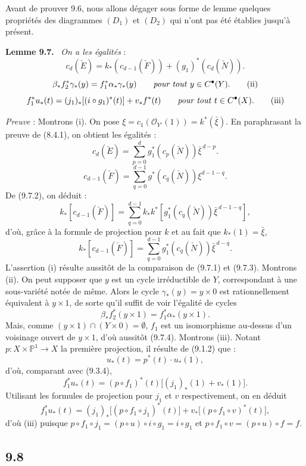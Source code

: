 \documentclass[11pt]{article}
\newenvironment{statement}[1]{\par\medskip\noindent\textbf{#1.}\ }{\par\medskip}
\begin{document}
Avant de prouver 9.6, nous allons dégager sous forme de lemme quelques propriétés des diagrammes $(D_1)$ et $(D_2)$ qui n'ont pas été établies jusqu'à présent.

\begin{statement}{Lemme 9.7}
\emph{On a les égalités} :
\[
c_d(\check E)=k_*(c_{d-1}(\check F))+(g_1)^*(c_d(\check N)).
\tag{i}
\]
\[
\beta_*f_2^*\gamma_*(y)=f_1^*\alpha_*\gamma_*(y)\qquad\text{\emph{pour tout} }y\in C^{\bullet}(Y).
\tag{ii}
\]
\[
f_1^*u_*(t)=(j_1)_*[(i\circ g_1)^*(t)]+v_*f^*(t)\qquad\text{\emph{pour tout} }t\in C^{\bullet}(X).
\tag{iii}
\]
\end{statement}

\emph{Preuve} : Montrons (i). On pose $\xi=c_1(\mathcal O_{Y'}(1))=k^*(\bar\xi)$. En paraphrasant la preuve de (8.4.1), on
obtient les égalités :
\[
c_d(\check E)=\sum_{p=0}^d g_1^*(c_p(\check N))\bar\xi^{\,d-p}.
\tag{9.7.1}
\]
\[
c_{d-1}(\check F)=\sum_{q=0}^{d-1}g^*(c_q(\check N))\xi^{d-1-q}.
\tag{9.7.2}
\]
De (9.7.2), on déduit :
\[
k_*[c_{d-1}(\check F)]
=\sum_{q=0}^{d-1}k_*k^*[g_1^*(c_q(\check N))\bar\xi^{\,d-1-q}],
\]
d'où, grâce à la formule de projection pour $k$ et au fait que $k_*(1)=\bar\xi$,
\[
k_*[c_{d-1}(\check F)]=\sum_{q=0}^{d-1}g_1^*(c_q(\check N))\bar\xi^{\,d-q}.
\tag{9.7.3}
\]
L'assertion (i) résulte aussitôt de la comparaison de (9.7.1) et (9.7.3). Montrons (ii). On peut supposer que $y$ est un cycle irréductible de $Y$, correspondant à une sous-variété notée de même. Alors le cycle $\gamma_*(y)=y\times0$ est rationnellement équivalent à $y\times1$, de sorte qu'il suffit de voir l'égalité de cycles
\[
\beta_*f_2^*(y\times1)=f_1^*\alpha_*(y\times1).
\tag{9.7.4}
\]
Mais, comme $(y\times1)\cap(Y\times0)=\emptyset$, $f_1$ est un isomorphisme au-dessus d'un voisinage ouvert de $y\times1$, d'où aussitôt (9.7.4). Montrons (iii). Notant $p:X\times\mathbb P^1\to X$ la première projection, il résulte de (9.1.2) que :
\[
u_*(t)=p^*(t)\cdot u_*(1),
\tag{9.7.5}
\]
d'où, comparant avec (9.3.4),
\[
f_1^*u_*(t)=(p\circ f_1)^*(t)\bigl[(j_1)_*(1)+v_*(1)\bigr].
\tag{9.7.6}
\]
Utilisant les formules de projection pour $j_1$ et $v$ respectivement, on en déduit
\[
f_1^*u_*(t)=(j_1)_*\bigl[(p\circ f_1\circ j_1)^*(t)\bigr]+v_*\bigl[(p\circ f_1\circ v)^*(t)\bigr],
\tag{9.7.7}
\]
d'où (iii) puisque $p\circ f_1\circ j_1=(p\circ u)\circ i\circ g_1=i\circ g_1$ et $p\circ f_1\circ v=(p\circ u)\circ f=f$.

\subsection*{9.8}
\end{document}
